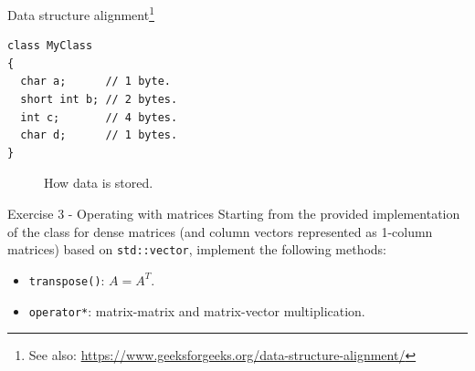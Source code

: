 \documentclass[10pt]{beamer}
\begin{document}
\begin{frame}[fragile]{Data structure alignment\footnote{See also: \url{https://www.geeksforgeeks.org/data-structure-alignment/}}}
    \begin{lstlisting}
class MyClass
{
  char a;      // 1 byte.
  short int b; // 2 bytes.
  int c;       // 4 bytes.
  char d;      // 1 bytes.
}
    \end{lstlisting}
    \begin{figure}
        \centering
        \caption{How data is  stored.}
    \end{figure}
\end{frame}


\begin{frame}{Exercise 3 - Operating with matrices}
Starting from the provided implementation of the class for dense matrices (and column vectors represented as 1-column matrices) based on \lstinline{std::vector}, implement the following methods:
\begin{itemize}
\item \lstinline{transpose()}: $A = A^{T}$.
\item \lstinline{operator*}: matrix-matrix and matrix-vector multiplication.
\end{itemize}
\end{frame}
\end{document}
